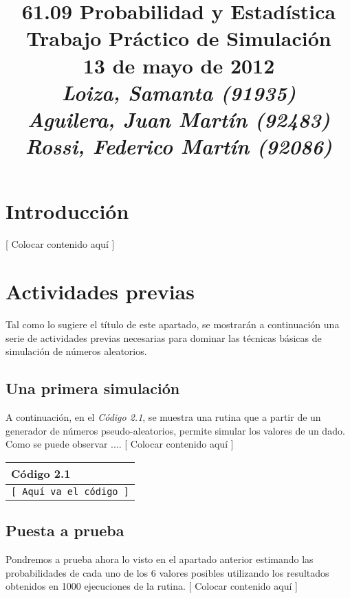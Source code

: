 \documentclass{article}
\begin{document}
\title{\huge 61.09 Probabilidad y Estadística \\ 
	  \Huge Trabajo Práctico de Simulación \\
	  \bigskip \Large 13 de mayo de 2012 \\
	  \bigskip \large \textit{Loiza, Samanta (91935)\\Aguilera, Juan Martín (92483)\\Rossi, Federico Martín (92086)}}
\date{}
\maketitle

\section{Introducción}
[ Colocar contenido aquí ]

\section{Actividades previas}

Tal como lo sugiere el título de este apartado, se mostrarán a continuación una serie de actividades previas necesarias para dominar las técnicas básicas de simulación de números aleatorios.

\subsection{Una primera simulación}

A continuación, en el \textit{Código 2.1}, se muestra una rutina que a partir de un generador de números pseudo-aleatorios, permite simular los valores de un dado. Como se puede observar .... [ Colocar contenido aquí ]
\bigskip

\begin{tabular*}{16cm}{l}
	\hline
	\textbf{Código 2.1} \\
	\hline \bigskip
	\texttt{[ Aquí va el código ]} \\
	\hline
\end{tabular*}
\bigskip

\subsection{Puesta a prueba}

Pondremos a prueba ahora lo visto en el apartado anterior estimando las probabilidades de cada uno de los 6 valores posibles utilizando los resultados obtenidos en 1000 ejecuciones de la rutina. [ Colocar contenido aquí ]
\end{document}
